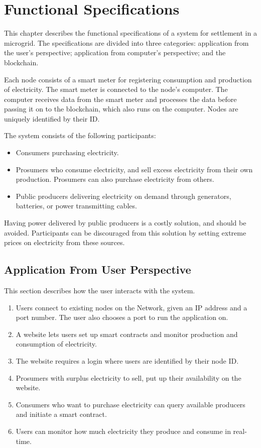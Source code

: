 \chapter{Functional Specifications} 
This chapter describes the functional specifications of a system for settlement in a microgrid. The specifications are divided into three categories: application from the user's perspective; application from computer's perspective; and the blockchain.

Each node consists of a smart meter for registering consumption and production of electricity. The smart meter is connected to the node's computer. The computer receives data from the smart meter and processes the data before passing it on to the blockchain, which also runs on the computer. Nodes are uniquely identified by their ID.  

The system consists of the following participants:

\begin{itemize}
\item Consumers purchasing electricity.
\item Prosumers who consume electricity, and sell excess electricity from their own production. Prosumers can also purchase electricity from others.
\item Public producers delivering electricity on demand through generators, batteries, or power transmitting cables. 
\end{itemize}

Having power delivered by public producers is a costly solution, and should be avoided. Participants can be discouraged from this solution by setting extreme prices on electricity from these sources.
\section{Application From User Perspective} \label{user}
This section describes how the user interacts with the system.

\begin{enumerate}
\item Users connect to existing nodes on the Network, given an IP address and a port number. The user also chooses a port to run the application on. 
\item A website lets users set up smart contracts and monitor production and consumption of electricity. 
\item The website requires a login where users are identified by their node ID. 
\item Prosumers with surplus electricity to sell, put up their availability on the website.
\item Consumers who want to purchase electricity can query available producers and initiate a smart contract.
\item Users can monitor how much electricity they produce and consume in real-time.
\end{enumerate}

